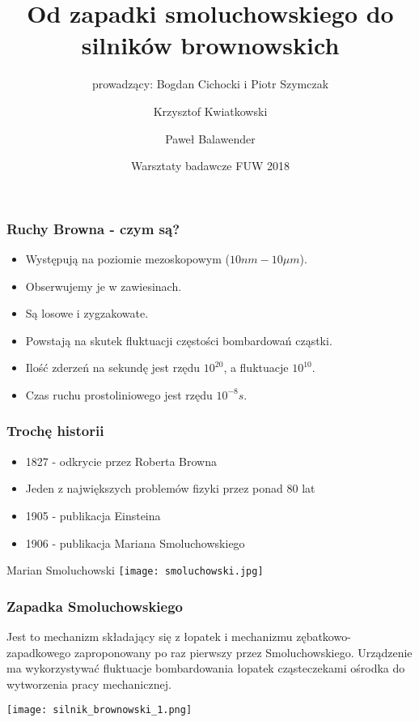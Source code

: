 \documentclass[10pt]{beamer}
\title{Od zapadki smoluchowskiego do silników brownowskich}
\subtitle{prowadzący: Bogdan Cichocki i Piotr Szymczak}
\author{Krzysztof Kwiatkowski \and Paweł Balawender}
\date{Warsztaty badawcze FUW 2018}
\begin{document}
	\frame{\titlepage}
	\begin{frame}
		\frametitle{Ruchy Browna - czym są?}
		\begin{minipage}{1\textwidth}
			\vspace{0.3cm}
			\begin{itemize}
				\item Występują na poziomie mezoskopowym ($10 nm - 10\mu m$).
				\item Obserwujemy je w zawiesinach.
				\item Są losowe i zygzakowate.
				\item Powstają na skutek fluktuacji częstości bombardowań cząstki.
				\item Ilość zderzeń na sekundę jest rzędu $10^{20}$, a fluktuacje $10^{10}$.
				\item Czas ruchu prostoliniowego jest rzędu $10^{-8}s$.
			\end{itemize}
		\end{minipage}
		\begin{minipage}{1\textwidth}
			\vspace{0.4cm}
			\Centering
		\end{minipage}
	\end{frame}
	\begin{frame}
		\frametitle{Trochę historii}
		\begin{minipage}{0.6\textwidth}
			\begin{itemize}
				\item 1827 - odkrycie przez Roberta Browna
				\item Jeden z największych problemów fizyki przez ponad 80 lat
				\item 1905 - publikacja Einsteina
				\item1906 - publikacja Mariana Smoluchowskiego
			\end{itemize}
		\end{minipage}
		\RaggedRight
		\begin{minipage}{0.38\textwidth}
			\Centering
			Marian Smoluchowski
			\vspace{0.4cm}
			\break
			\texttt{[image: smoluchowski.jpg]}	
		\end{minipage}
	\end{frame}
	\begin{frame}
		\frametitle{Zapadka Smoluchowskiego}
		\begin{minipage}{1\textwidth}
			\justify
			\hspace{1em}
			Jest to mechanizm składający się z łopatek i mechanizmu zębatkowo-zapadkowego zaproponowany po raz pierwszy przez Smoluchowskiego. Urządzenie ma wykorzystywać fluktuacje bombardowania łopatek cząsteczekami ośrodka do wytworzenia pracy mechanicznej.
			\vspace{0.3cm}
		\end{minipage}
		\begin{minipage}{1\textwidth}
			\Centering
			\texttt{[image: silnik\_brownowski\_1.png]}
		\end{minipage}
	\end{frame}
\end{document}
